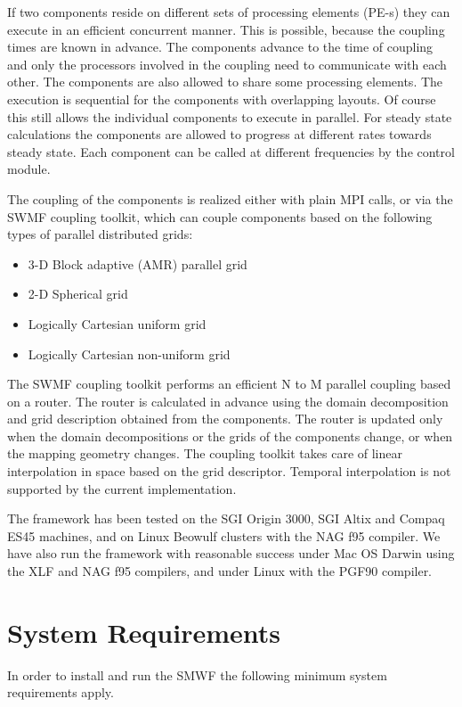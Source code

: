 If two components reside on different sets of processing elements
(PE-s) they can execute in an efficient concurrent manner.
This is possible, because the coupling times are
known in advance.  The components advance to the time of coupling and
only the processors involved in the coupling need to communicate with
each other. The components are also allowed to share some processing elements.
The execution is sequential for the components with overlapping layouts.
Of course this still allows the individual components to execute in parallel.
For steady state calculations the components are allowed to progress
at different rates towards steady state. Each component can be called
at different frequencies by the control module.

The coupling of the components is realized either with plain MPI
calls, or via the SWMF coupling toolkit, which can couple components
based on the following types of parallel distributed grids:
\begin{itemize}
\item 3-D Block adaptive (AMR) parallel grid
\item 2-D Spherical grid
\item Logically Cartesian uniform grid
\item Logically Cartesian non-uniform grid 
\end{itemize}
The SWMF coupling toolkit performs an efficient N to M parallel
coupling based on a router. The router is calculated in advance using
the domain decomposition and grid description obtained from the
components.  The router is updated only when the domain decompositions
or the grids of the components change, or when the mapping geometry
changes.  The coupling toolkit takes care of linear interpolation in
space based on the grid descriptor.  Temporal interpolation is not
supported by the current implementation.

The framework has been tested on the SGI Origin 3000, SGI Altix and 
Compaq ES45 machines, and on Linux Beowulf clusters with the NAG f95 
compiler. We have also run the framework with reasonable success under
Mac OS Darwin using the XLF and NAG f95 compilers, and under Linux with
the PGF90 compiler.

\section{System Requirements}

In order to install and run the SMWF the following minimum system
requirements apply.

